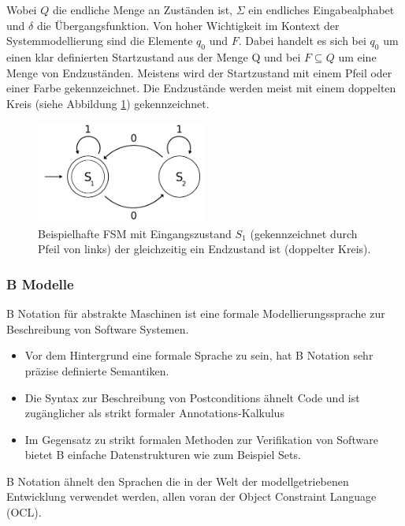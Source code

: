 Wobei $Q$ die endliche Menge an Zuständen ist, $\Sigma$ ein endliches Eingabealphabet und $\delta$ die Übergangsfunktion. Von hoher Wichtigkeit im Kontext der Systemmodellierung sind die Elemente $q_0$ und $F$. Dabei handelt es sich bei $q_0$ um einen klar definierten Startzustand aus der Menge Q und bei $F \subseteq Q$ um eine Menge von Endzuständen. Meistens wird der Startzustand mit einem Pfeil oder einer Farbe gekennzeichnet. Die Endzustände werden meist mit einem doppelten Kreis (siehe Abbildung \ref{fig:fsm_example}) gekennzeichnet.

\begin{figure}[h] 
  \centering
     \includegraphics[width=0.5\textwidth]{figures/FSM_example.png}
  \caption{Beispielhafte FSM mit Eingangszustand $S_1$ (gekennzeichnet durch Pfeil von links) der gleichzeitig ein Endzustand ist (doppelter Kreis).}
  \label{fig:fsm_example}
\end{figure}

\subsubsection{B Modelle}
B Notation für abstrakte Maschinen ist eine formale Modellierungssprache zur Beschreibung von Software Systemen.
\begin{itemize}
\item Vor dem Hintergrund eine formale Sprache zu sein, hat B Notation sehr präzise definierte Semantiken.
\item Die Syntax zur Beschreibung von Postconditions ähnelt Code und ist zugänglicher als strikt formaler Annotations-Kalkulus 
\item Im Gegensatz zu strikt formalen Methoden zur Verifikation von Software bietet B einfache Datenstrukturen wie zum Beispiel Sets.
\end{itemize}

B Notation ähnelt den Sprachen die in der Welt der modellgetriebenen Entwicklung verwendet werden, allen voran der Object Constraint Language (OCL). 

